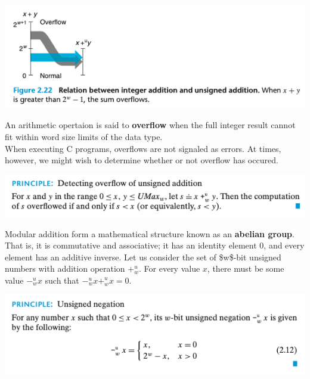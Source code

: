 \documentclass[11pt]{article}
\begin{document}
\begin{center}
\includegraphics[width=.9\linewidth]{pics/unsigned-addition-example.png}
\end{center}


An arithmetic opertaion is said to \textbf{overflow} when the full integer result cannot fit within word size limits of the data type.\\

When executing C programs, overflows are not signaled as errors. At times, however, we might wish to determine whether or not overflow has occured.\\

\begin{center}
\includegraphics[width=.9\linewidth]{pics/determining-overflow-of-unsigned-addition.png}
\end{center}



Modular addition form a mathematical structure known as an \textbf{abelian group}. That is, it is commutative and associative; it has an identity element 0, and every element has an additive inverse. Let us consider the set of \$w\$-bit unsigned numbers with addition operation \(+_w^u\). For every value \(x\), there must be some value \(-_w^ux\) such that \(-_w^ux +_w^u x=0\).\\

\begin{center}
\includegraphics[width=.9\linewidth]{pics/unsigned-negation.png}
\end{center}
\end{document}
